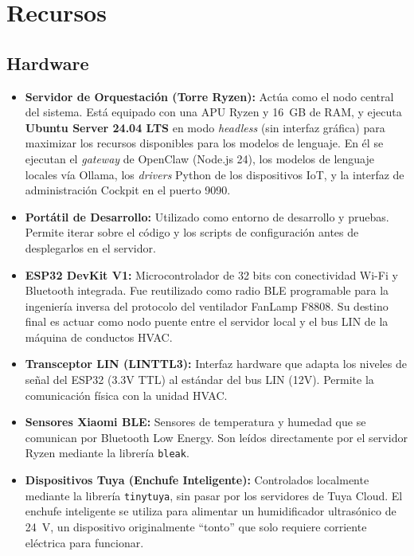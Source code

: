 \chapter{Recursos}
\label{cap:recursos}

\section{Hardware}

\begin{itemize}
    \item \textbf{Servidor de Orquestación (Torre Ryzen):} Actúa como el nodo central del sistema. Está equipado con una APU Ryzen y 16~GB de RAM, y ejecuta \textbf{Ubuntu Server 24.04 LTS} en modo \textit{headless} (sin interfaz gráfica) para maximizar los recursos disponibles para los modelos de lenguaje. En él se ejecutan el \textit{gateway} de OpenClaw (Node.js 24), los modelos de lenguaje locales vía Ollama, los \textit{drivers} Python de los dispositivos IoT, y la interfaz de administración Cockpit en el puerto 9090.

    \item \textbf{Portátil de Desarrollo:} Utilizado como entorno de desarrollo y pruebas. Permite iterar sobre el código y los scripts de configuración antes de desplegarlos en el servidor.

    \item \textbf{ESP32 DevKit V1:} Microcontrolador de 32 bits con conectividad Wi-Fi y Bluetooth integrada. Fue reutilizado como radio BLE programable para la ingeniería inversa del protocolo del ventilador FanLamp F8808. Su destino final es actuar como nodo puente entre el servidor local y el bus LIN de la máquina de conductos HVAC.

    \item \textbf{Transceptor LIN (LINTTL3):} Interfaz hardware que adapta los niveles de señal del ESP32 (3.3V TTL) al estándar del bus LIN (12V). Permite la comunicación física con la unidad HVAC.

    \item \textbf{Sensores Xiaomi BLE:} Sensores de temperatura y humedad que se comunican por Bluetooth Low Energy. Son leídos directamente por el servidor Ryzen mediante la librería \texttt{bleak}.

    \item \textbf{Dispositivos Tuya (Enchufe Inteligente):} Controlados localmente mediante la librería \texttt{tinytuya}, sin pasar por los servidores de Tuya Cloud. El enchufe inteligente se utiliza para alimentar un humidificador ultrasónico de 24~V, un dispositivo originalmente ``tonto'' que solo requiere corriente eléctrica para funcionar.


\end{itemize}
